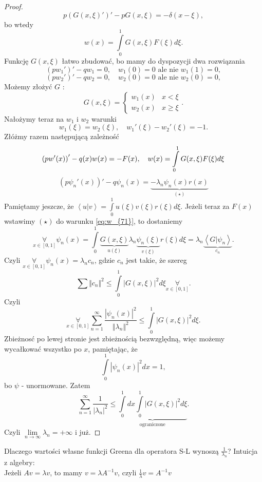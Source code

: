 \documentclass[../main.tex]{subfiles}
\begin{document}
\begin{proof}
\[
		p\left( G(x,\xi)' \right) ' - p G(x,\xi) = -\delta(x-\xi)
,\]
bo wtedy
\[
w(x) = \int\limits_0^1 G(x,\xi)F(\xi)d\xi
.\]
Funkcję $G(x,\xi)$ łatwo zbudować, bo mamy do dyspozycji dwa rozwiązania
\[
		(pw_1')' - qw_1 = 0,\quad w_1(0) = 0 \text{ ale nie }w_1(1) = 0
,\]
\[
		(pw_2')' - qw_2 = 0,\quad w_2(0) = 0 \text{ ale nie }w_2(0) = 0
,\]
Możemy złożyć $G$ :
\[
		G(x,\xi) = \begin{cases}
				w_1(x)&x < \xi\\
				w_2(x)&x \ge \xi
		\end{cases}
.\]
Nałożymy teraz na $w_1$ i $w_2$ warunki
\[
		w_1(\xi) = w_2(\xi),\quad w_1'(\xi) - w_2'(\xi) = -1
.\]
Złóżmy razem następującą zależność
\begin{equation}
		\left( pw'(x) \right) ' - q(x)w(x) = -F(x),\quad w(x) = \int\limits_0^1 G(x,\xi) F(\xi)d\xi
		\label{eq:w_{71}}
\end{equation}
\begin{equation}
		\left( p\psi_n'(x) \right) ' - q\psi_n(x) = \underbrace{-\lambda_n \psi_n(x)r(x)}_{(\star)}
\end{equation}
Pamiętamy jeszcze, że $\left<u|v \right> = \int\limits_0^1 u(\xi)v(\xi)r(\xi)d\xi$. Jeżeli teraz za $F(x)$ wstawimy $(\star)$ do warunku \ref{eq:w_{71}}, to dostaniemy
\[
		\underset{x\in [0,1]}{\forall} 	\psi_n(x) = \int\limits_0^1 \underbrace{G(x,\xi)}_{u(\xi)} \lambda_n \underbrace{\psi_n(\xi)}_{v(\xi)} r(\xi) d\xi = \lambda_n \underbrace{\left<G|\psi_n \right>}_{c_n}
.\]
Czyli $\underset{x\in [0,1]}{\forall}  \psi_n(x) = \lambda_n c_n$, gdzie $c_n$ jest takie, że szereg
\[
		\sum \Vert c_n \Vert ^2 \le \int\limits_0^1 \left| G(x,\xi) \right| ^2 d\xi \underset{x\in[0,1]}{\forall}
.\]
Czyli
\[
		\underset{x\in[0,1]}{\forall} \sum_{n=1}^{\infty} \frac{\left| \psi_n(x) \right| ^2}{\Vert \lambda_n \Vert^2 } \le \int\limits_0^1 \left| G(x,\xi) \right| ^2 d\xi
.\]
Zbieżnosć po lewej stronie jest zbieżnością bezwzględną, więc możemy wycałkować wszystko po $x$, pamiętając, że
\[
		\int\limits_0^1 \left| \psi_n(x) \right| ^2 dx = 1
,\]
bo $\psi$ - unormowane. Zatem
\[
		\sum_{n=1}^{\infty} \frac{1}{\left| \lambda_n \right| ^2}\le \underbrace{\int\limits_0^1 dx \int\limits_0^1 \left| G(x,\xi) \right| ^2 d\xi}_{\text{ograniczone}}
.\]
Czyli $\lim\limits_{n \to \infty}\lambda_n = +\infty$ i już.
		\end{proof}
		\begin{pytanie}
				Dlaczego wartości własne funkcji Greena dla operatora S-L wynoszą $\frac{1}{\lambda_n}$? Intuicja z algebry:\\
				Jeżeli $Av = \lambda v$, to mamy $v = \lambda A^{-1}v$, czyli $\frac{1}{\lambda}v = A^{-1}v$
		\end{pytanie}
\end{document}
